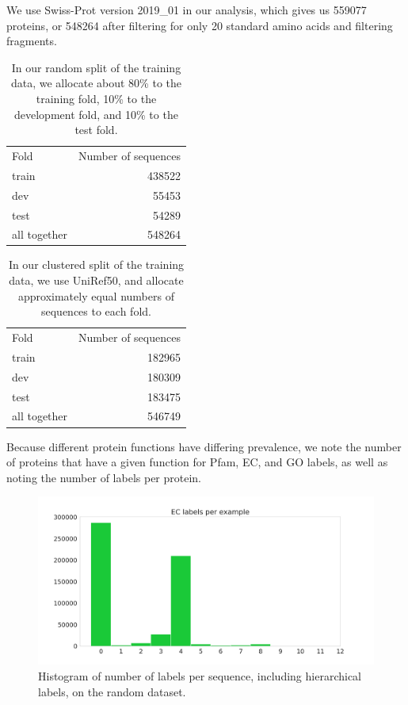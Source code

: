 We use Swiss-Prot version 2019\_01 in our analysis, which gives us 559077 proteins, or 548264 after filtering for only 20 standard amino acids and filtering fragments.
\begin{table}[htbp]
\centering
\begin{tabular}{|l|r|}
\hline
         Fold &  Number of sequences \\
\Xhline{2pt}
        train &               438522 \\
\hline
          dev &               55453 \\
\hline
         test &               54289 \\
\hline
 all together &               548264 \\
\hline
\end{tabular}
\caption{In our random split of the training data, we allocate about 80\% to the training fold, 10\% to the development fold, and 10\% to the test fold.}
\end{table}
\begin{table}[htbp]
\centering
\begin{tabular}{|l|r|}
\hline
         Fold &  Number of sequences \\
\Xhline{2pt}
        train &               182965 \\
\hline
          dev &               180309 \\
\hline
         test &               183475 \\
\hline
 all together &               546749 \\
\hline
\end{tabular}
\caption{In our clustered split of the training data, we use UniRef50, and allocate approximately equal numbers of sequences to each fold.}
\end{table}
Because different protein functions have differing prevalence, we note the number of proteins that have a given function for Pfam, EC, and GO labels, as well as noting the number of labels per protein.
\begin{figure}[htbp]
\centering
  \includegraphics[width=\textwidth]{Figures/ec_label_distribution.png}
  \caption{Histogram of number of labels per sequence, including hierarchical labels, on the random dataset.}
\end{figure}
